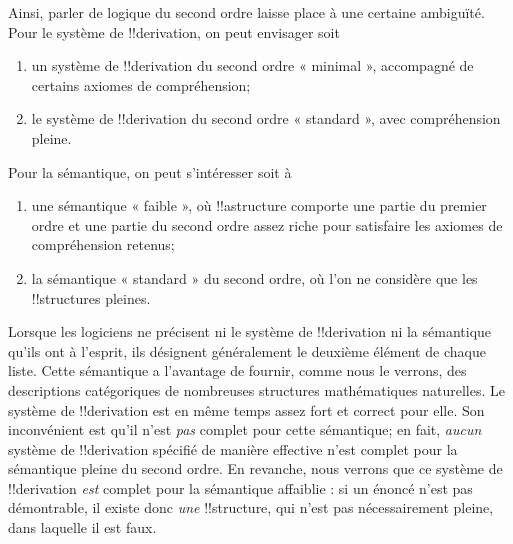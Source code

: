 \documentclass[../../../include/open-logic-section]{subfiles}
\begin{document}
Ainsi, parler de logique du second ordre laisse place à une certaine
ambiguïté. Pour le système de !!{derivation}, on peut envisager soit
\begin{enumerate}
\item un système de !!{derivation} du second ordre « minimal »,
  accompagné de certains axiomes de compréhension;
\item le système de !!{derivation} du second ordre « standard »,
  avec compréhension pleine.
\end{enumerate}
Pour la sémantique, on peut s'intéresser soit à
\begin{enumerate}
\item une sémantique « faible », où !!a{structure} comporte une
  partie du premier ordre et une partie du second ordre assez riche
  pour satisfaire les axiomes de compréhension retenus;
\item la sémantique « standard » du second ordre, où l'on ne
  considère que les !!{structure}s pleines.
\end{enumerate}
Lorsque les logiciens ne précisent ni le système de !!{derivation}
ni la sémantique qu'ils ont à l'esprit, ils désignent généralement
le deuxième élément de chaque liste. Cette sémantique a l'avantage
de fournir, comme nous le verrons, des descriptions catégoriques
de nombreuses structures mathématiques naturelles. Le système de
!!{derivation} est en même temps assez fort et correct pour elle.
Son inconvénient est qu'il n'est \emph{pas} complet pour cette
sémantique; en fait, \emph{aucun} système de !!{derivation}
spécifié de manière effective n'est complet pour la sémantique pleine du
second ordre. En revanche, nous verrons que ce système de
!!{derivation} \emph{est} complet pour la sémantique affaiblie :
si un énoncé n'est pas démontrable, il existe donc \emph{une}
!!{structure}, qui n'est pas nécessairement pleine, dans laquelle
il est faux.
\end{document}
